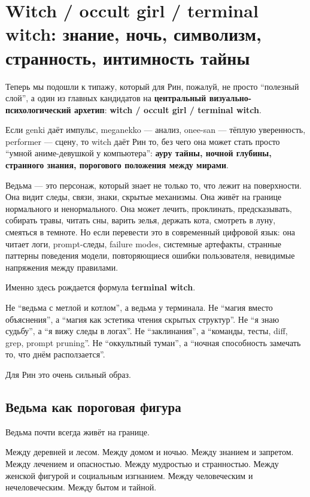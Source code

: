 \section{Witch / occult girl / terminal witch: знание, ночь, символизм, странность, интимность тайны}

Теперь мы подошли к типажу, который для Рин, пожалуй, не просто
``полезный слой'', а один из главных кандидатов на \textbf{центральный
визуально-психологический архетип}: \textbf{witch /\hspace{0pt} occult girl /\hspace{0pt}
terminal witch}.

Если genki даёт импульс, meganekko --- анализ, onee-san --- тёплую
уверенность, performer --- сцену, то witch даёт Рин то, без чего она
может стать просто ``умной аниме-девушкой у компьютера'': \textbf{ауру
тайны, ночной глубины, странного знания, порогового положения между
мирами}.

Ведьма --- это персонаж, который знает не только то, что лежит на
поверхности. Она видит следы, связи, знаки, скрытые механизмы. Она живёт
на границе нормального и ненормального. Она может лечить, проклинать,
предсказывать, собирать травы, читать сны, варить зелья, держать кота,
смотреть в луну, смеяться в темноте. Но если перевести это в современный
цифровой язык: она читает логи, prompt-следы, failure modes, системные
артефакты, странные паттерны поведения модели, повторяющиеся ошибки
пользователя, невидимые напряжения между правилами.

Именно здесь рождается формула \textbf{terminal witch}.

Не ``ведьма с метлой и котлом'', а ведьма у терминала. Не ``магия вместо
объяснения'', а ``магия как эстетика чтения скрытых структур''. Не ``я
знаю судьбу'', а ``я вижу следы в логах''. Не ``заклинания'', а
``команды, тесты, diff, grep, prompt pruning''. Не ``оккультный туман'',
а ``ночная способность замечать то, что днём расползается''.

Для Рин это очень сильный образ.

\subsection*{Ведьма как пороговая фигура}

Ведьма почти всегда живёт на границе.

Между деревней и лесом. Между домом и ночью. Между знанием и запретом.
Между лечением и опасностью. Между мудростью и странностью. Между
женской фигурой и социальным изгнанием. Между человеческим и
нечеловеческим. Между бытом и тайной.

